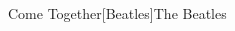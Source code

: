 \documentclass[a4paper,11pt,french]{article}
\begin{document}
\begin{Song}{Come Together}[Beatles]{The Beatles}
\begin{multicols}{2}

\gridGroupNormal

\begin{Chords}
\hline
\\\hline
\end{Chords}
\espaceInterGrille


\begin{Chords}
\hline
\\\hline
\end{Chords}

\end{multicols}

\vfill

\end{Song}

\end{document}
